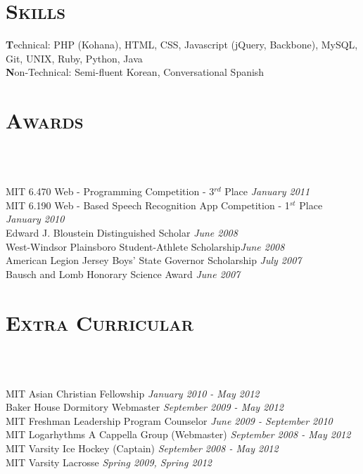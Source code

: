 \begin{resume}
\section{\textsc{Skills}}

\textbf Technical: PHP (Kohana), HTML, CSS, Javascript (jQuery, Backbone), MySQL, Git, UNIX, Ruby, Python, Java\\

\textbf Non-Technical: Semi-fluent Korean, Conversational Spanish

\section{\textsc{Awards}}

\begin{formatb}
  \\
  \body\\
\end{formatb}
MIT 6.470 Web - Programming Competition - 3$^{rd}$ Place \hfill{\em{January 2011}}\\
MIT 6.190 Web - Based Speech Recognition App Competition - 1$^{st}$ Place \hfill{\em{January 2010}}\\
Edward J. Bloustein Distinguished Scholar \hfill{\em{June 2008}}\\
West-Windsor Plainsboro Student-Athlete Scholarship\hfill{\em{June 2008}}\\
American Legion Jersey Boys' State Governor Scholarship \hfill{\em{July 2007}}\\
Bausch and Lomb Honorary Science Award \hfill{\em{June 2007}}

\section{\textsc{Extra Curricular}}
\begin{formatb}
  \\
  \body\\
\end{formatb}
MIT Asian Christian Fellowship \hfill{\em{January 2010 - May 2012}}\\
Baker House Dormitory Webmaster \hfill{\em{September 2009 - May 2012}}\\
MIT Freshman Leadership Program Counselor \hfill{\em{June 2009 - September 2010}}\\
MIT Logarhythms A Cappella Group (Webmaster) \hfill{\em{September 2008 - May 2012}}\\
MIT Varsity Ice Hockey (Captain) \hfill{\em{September 2008 - May 2012}}\\
MIT Varsity Lacrosse \hfill{\em{Spring 2009, Spring 2012}}



\end{resume}
